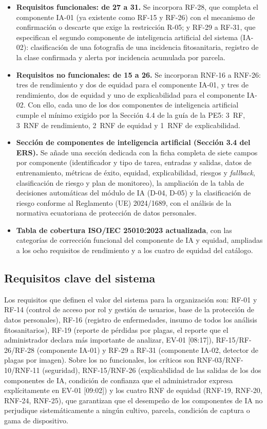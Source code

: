\begin{itemize}
  \item \textbf{Requisitos funcionales: de 27 a 31.} Se incorpora RF-28, que completa el componente IA-01 (ya existente como RF-15 y RF-26) con el mecanismo de confirmación o descarte que exige la restricción R-05; y RF-29 a RF-31, que especifican el segundo componente de inteligencia artificial del sistema (IA-02): clasificación de una fotografía de una incidencia fitosanitaria, registro de la clase confirmada y alerta por incidencia acumulada por parcela.
  \item \textbf{Requisitos no funcionales: de 15 a 26.} Se incorporan RNF-16 a RNF-26: tres de rendimiento y dos de equidad para el componente IA-01, y tres de rendimiento, dos de equidad y uno de explicabilidad para el componente IA-02. Con ello, cada uno de los dos componentes de inteligencia artificial cumple el mínimo exigido por la Sección 4.4 de la guía de la PE5: 3~RF, 3~RNF de rendimiento, 2~RNF de equidad y 1~RNF de explicabilidad.
  \item \textbf{Sección de componentes de inteligencia artificial (Sección 3.4 del ERS).} Se añade una sección dedicada con la ficha completa de siete campos por componente (identificador y tipo de tarea, entradas y salidas, datos de entrenamiento, métricas de éxito, equidad, explicabilidad, riesgos y \emph{fallback}, clasificación de riesgo y plan de monitoreo), la ampliación de la tabla de decisiones automáticas del módulo de IA (D-04, D-05) y la clasificación de riesgo conforme al Reglamento (UE) 2024/1689, con el análisis de la normativa ecuatoriana de protección de datos personales.
  \item \textbf{Tabla de cobertura ISO/IEC 25010:2023 actualizada}, con las categorías de corrección funcional del componente de IA y equidad, ampliadas a los ocho requisitos de rendimiento y a los cuatro de equidad del catálogo.
\end{itemize}

\subsection{Requisitos clave del sistema}

Los requisitos que definen el valor del sistema para la organización son: RF-01 y RF-14 (control de acceso por rol y gestión de usuarios, base de la protección de datos personales), RF-16 (registro de enfermedades, insumo de todos los análisis fitosanitarios), RF-19 (reporte de pérdidas por plagas, el reporte que el administrador declara más importante de analizar, EV-01 [08:17]), RF-15/RF-26/RF-28 (componente IA-01) y RF-29 a RF-31 (componente IA-02, detector de plagas por imagen). Sobre los no funcionales, los críticos son RNF-03/RNF-10/RNF-11 (seguridad), RNF-15/RNF-26 (explicabilidad de las salidas de los dos componentes de IA, condición de confianza que el administrador expresa explícitamente en EV-01 [09:02]) y los cuatro RNF de equidad (RNF-19, RNF-20, RNF-24, RNF-25), que garantizan que el desempeño de los componentes de IA no perjudique sistemáticamente a ningún cultivo, parcela, condición de captura o gama de dispositivo.

